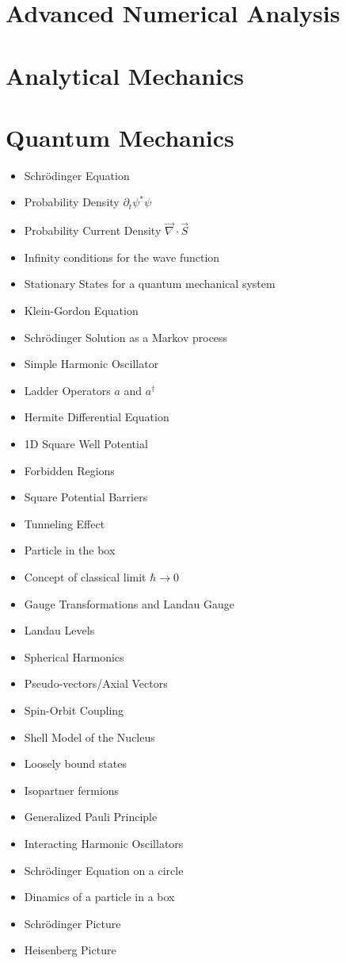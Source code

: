 \documentclass[10pt]{article}
\begin{document}
\section{Advanced Numerical Analysis}
\section{Analytical Mechanics}
\section{Quantum Mechanics}
\begin{itemize}
	\item Schr\"odinger Equation
	\item Probability Density $\partial_t \psi^*\psi$
	\item Probability Current Density $\vec{\nabla}\cdot\vec{S}$
	\item Infinity conditions for the wave function
	\item Stationary States for a quantum mechanical system
	\item Klein-Gordon Equation
	\item Schr\"odinger Solution as a Markov process
	\item Simple Harmonic Oscillator
	\item Ladder Operators $a$ and $a^{\dag}$
	\item Hermite Differential Equation
	\item 1D Square Well Potential
	\item Forbidden Regions
	\item Square Potential Barriers
	\item Tunneling Effect
	\item Particle in the box
	\item Concept of classical limit $\hbar \to 0$
	\item Gauge Transformations and Landau Gauge
	\item Landau Levels
	\item Spherical Harmonics
	\item Pseudo-vectors/Axial Vectors
	\item Spin-Orbit Coupling
	\item Shell Model of the Nucleus
	\item Loosely bound states
	\item Isopartner fermions
	\item Generalized Pauli Principle
	\item Interacting Harmonic Oscillators
	\item Schr\"odinger Equation on a circle
	\item Dinamics of a particle in a box
	\item Schr\"odinger Picture
	\item Heisenberg Picture
\end{itemize}
\end{document}

